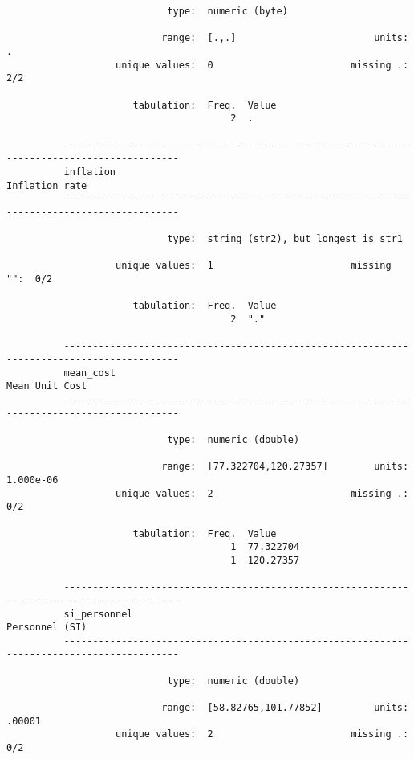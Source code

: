 \documentclass{article}
\begin{document}
\begin{verbatim}
                            type:  numeric (byte)
          
                           range:  [.,.]                        units:  .
                   unique values:  0                        missing .:  2/2
          
                      tabulation:  Freq.  Value
                                       2  .
          
          ------------------------------------------------------------------------------------------
          inflation                                                                   Inflation rate
          ------------------------------------------------------------------------------------------
          
                            type:  string (str2), but longest is str1
          
                   unique values:  1                        missing "":  0/2
          
                      tabulation:  Freq.  Value
                                       2  "."
          
          ------------------------------------------------------------------------------------------
          mean_cost                                                                   Mean Unit Cost
          ------------------------------------------------------------------------------------------
          
                            type:  numeric (double)
          
                           range:  [77.322704,120.27357]        units:  1.000e-06
                   unique values:  2                        missing .:  0/2
          
                      tabulation:  Freq.  Value
                                       1  77.322704
                                       1  120.27357
          
          ------------------------------------------------------------------------------------------
          si_personnel                                                                Personnel (SI)
          ------------------------------------------------------------------------------------------
          
                            type:  numeric (double)
          
                           range:  [58.82765,101.77852]         units:  .00001
                   unique values:  2                        missing .:  0/2
          

\end{verbatim}
\end{document}
